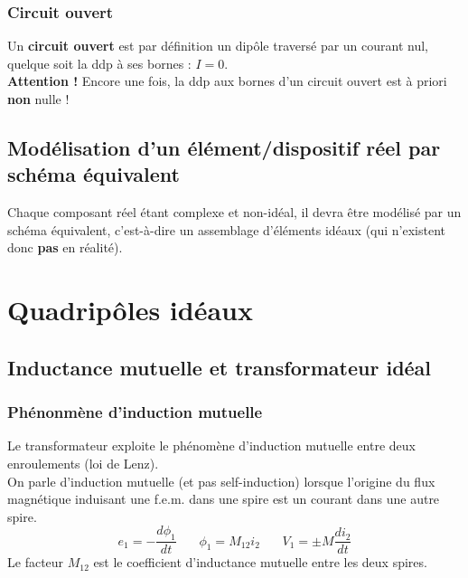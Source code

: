\documentclass	[11pt, a4paper, openany]{book}
\begin{document}
	\subsection{Circuit ouvert}
	Un \textbf{circuit ouvert} est par définition un dipôle traversé par un courant nul, quelque soit la ddp à ses bornes : $I =0$.\\
	\textbf{Attention !} Encore une fois, la ddp aux bornes d'un circuit ouvert est à priori \textbf{non} nulle !
	
	\setcounter{section}{8}
	\section{Modélisation d'un élément/dispositif réel par schéma équivalent}
	Chaque composant réel étant complexe et non-idéal, il devra être modélisé par un schéma équivalent, c'est-à-dire un assemblage d'éléments idéaux (qui n'existent donc \textbf{pas} en réalité).
	
	
	\chapter{Quadripôles idéaux}
	\setcounter{section}{2}
	\section{Inductance mutuelle et transformateur idéal}
	\subsection{Phénonmène d'induction mutuelle}
	Le transformateur exploite le phénomène d'induction mutuelle entre deux enroulements (loi de Lenz).\\
	On parle d'induction mutuelle (et pas self-induction) lorsque l'origine du flux magnétique induisant une f.e.m. dans une spire est un courant dans une autre spire.
	\begin{equation}
		e_1 = -\frac{d\phi_1}{dt}\ \ \ \ \ \ \ \ \phi_1 = M_{12}i_2\ \ \ \ \ \ \ \ V_1 = \pm M\frac{di_2}{dt}
	\end{equation}
	Le facteur $M_{12}$ est le coefficient d'inductance mutuelle entre les deux spires.
	
\end{document}
